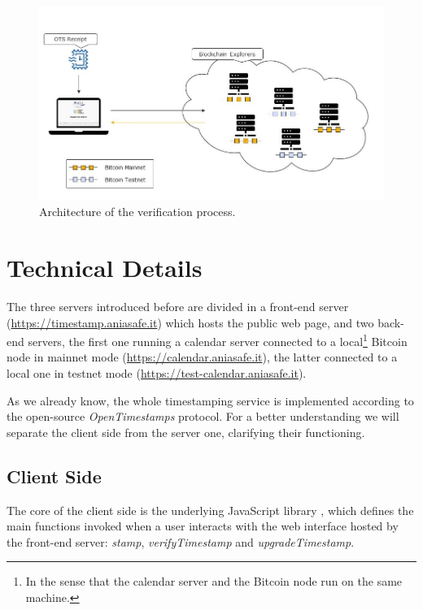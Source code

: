 \bigskip
\begin{figure}[!htb]
    \centering
	\includegraphics[width=1\linewidth]{Images/project-verifying.jpg}
	\caption{Architecture of the verification process.}
	\label{fig:ots-project-verifying}
\end{figure}

\bigskip
\section{Technical Details}
The three servers introduced before are divided in a front-end server (\url{https://timestamp.aniasafe.it}) which hosts the public web page, and two back-end servers, the first one running a calendar server connected to a local\footnote{In the sense that the calendar server and the Bitcoin node run on the same machine.} Bitcoin node in mainnet mode (\url{https://calendar.aniasafe.it}), the latter connected to a local one in testnet mode (\url{https://test-calendar.aniasafe.it}).

\bigskip
\noindent
As we already know, the whole timestamping service is implemented according to the open-source \textit{OpenTimestamps} protocol. For a better understanding we will separate the client side from the server one, clarifying their functioning.

\bigskip
\subsection{Client Side}
\label{sec:client-side}
The core of the client side is the underlying JavaScript library \cite{LibraryRepositoryGitHub}, which defines the main functions invoked when a user interacts with the web interface hosted by the front-end server: \textit{stamp}, \textit{verifyTimestamp} and \textit{upgradeTimestamp}.

